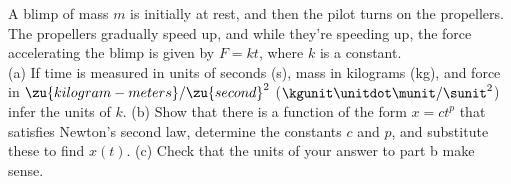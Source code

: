 A blimp of mass $m$ is initially at rest, and then
the pilot turns on the propellers. The propellers gradually
speed up, and while they're speeding up, the force accelerating
the blimp is given by $F=kt$, where $k$ is a constant.\\
(a) If time is measured in units of seconds (s), mass in kilograms (kg), 
and force in $\zu{kilogram-meters}/\zu{second}^2$ ($\kgunit\unitdot\munit/\sunit^2$) infer the units of $k$.\hwendpart
%
(b)
Show that there is a function of the form $x=ct^p$ that
satisfies Newton's second law, determine the constants
$c$ and $p$, and substitute these to find $x(t)$.\hwendpart
%
(c)
Check that the units of your answer to part b make sense.
\answercheck
